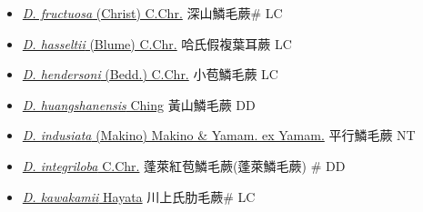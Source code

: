 \begin{itemize}
\begin{itemize}
        \item[] \href{http://www.theplantlist.org/tpl1.1/search?q=Dryopteris+fructuosa}{\textit{D. fructuosa} (Christ) C.Chr.}     深山鱗毛蕨\# LC
        \item[] \href{http://www.theplantlist.org/tpl1.1/search?q=Dryopteris+hasseltii}{\textit{D. hasseltii} (Blume) C.Chr.}     哈氏假複葉耳蕨 LC
        \item[] \href{http://www.theplantlist.org/tpl1.1/search?q=Dryopteris+hendersoni}{\textit{D. hendersoni} (Bedd.) C.Chr.}   小苞鱗毛蕨 LC
        \item[] \href{http://www.theplantlist.org/tpl1.1/search?q=Dryopteris+huangshanensis}{\textit{D. huangshanensis} Ching}   黃山鱗毛蕨 DD
        \item[] \href{http://www.theplantlist.org/tpl1.1/search?q=Dryopteris+indusiata}{\textit{D. indusiata} (Makino) Makino \& Yamam. ex Yamam.}   平行鱗毛蕨 NT
        \item[] \href{http://www.theplantlist.org/tpl1.1/search?q=Dryopteris+integriloba}{\textit{D. integriloba} C.Chr.}     蓬萊紅苞鱗毛蕨(蓬萊鱗毛蕨)  \# DD
        \item[] \href{http://www.theplantlist.org/tpl1.1/search?q=Dryopteris+kawakamii}{\textit{D. kawakamii} Hayata}     川上氏肋毛蕨\# LC

\end{itemize}
\end{itemize}

